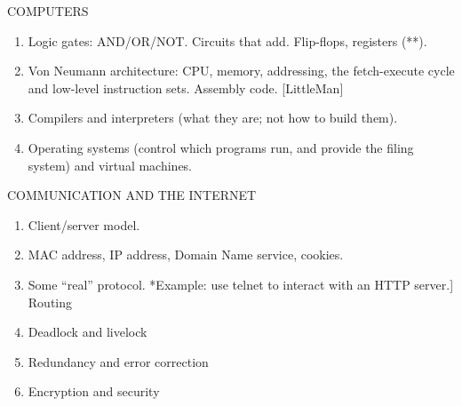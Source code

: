 
COMPUTERS
\begin{enumerate}
\item Logic gates: AND/OR/NOT. Circuits that add. Flip-flops, registers (**).
\item Von Neumann architecture: CPU, memory, addressing, the fetch-execute cycle and
low-level instruction sets. Assembly code. [LittleMan]
\item Compilers and interpreters (what they are; not how to build them).
\item Operating systems (control which programs run, and provide the filing system) and
virtual machines.
\end{enumerate}

COMMUNICATION AND THE INTERNET
\begin{enumerate}
\item Client/server model.
\item MAC address, IP address, Domain Name service, cookies.
\item Some “real” protocol. *Example: use telnet to interact with an HTTP server.]
Routing
\item Deadlock and livelock
\item Redundancy and error correction
\item Encryption and security
\end{enumerate}


